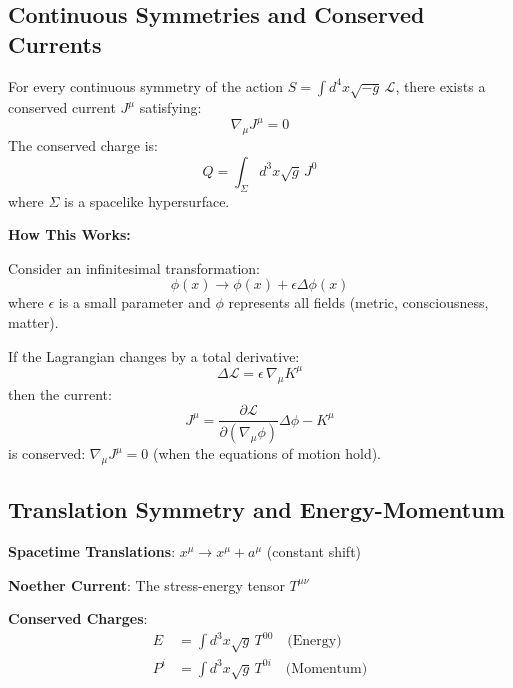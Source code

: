 \subsection{Continuous Symmetries and Conserved Currents}

\begin{theorem}\label{thm:noether}
For every continuous symmetry of the action $S = \int d^4x \sqrt{-g} \, \mathcal{L}$, there exists a conserved current $J^\mu$ satisfying\cite{noether1918,misner1973}:
\begin{equation}
\nabla_\mu J^\mu = 0
\end{equation}
The conserved charge is:
\begin{equation}
Q = \int_\Sigma d^3x \sqrt{g} \, J^0
\end{equation}
where $\Sigma$ is a spacelike hypersurface.
\end{theorem}

\begin{level2}
\textbf{How This Works:}

Consider an infinitesimal transformation:
\begin{equation}
\phi(x) \to \phi(x) + \epsilon \Delta\phi(x)
\end{equation}
where $\epsilon$ is a small parameter and $\phi$ represents all fields (metric, consciousness, matter).

If the Lagrangian changes by a total derivative:
\begin{equation}
\Delta \mathcal{L} = \epsilon \, \nabla_\mu K^\mu
\end{equation}
then the current:
\begin{equation}
J^\mu = \frac{\partial \mathcal{L}}{\partial(\nabla_\mu \phi)} \Delta\phi - K^\mu
\end{equation}
is conserved: $\nabla_\mu J^\mu = 0$ (when the equations of motion hold).
\end{level2}

\subsection{Translation Symmetry and Energy-Momentum}

\textbf{Spacetime Translations}: $x^\mu \to x^\mu + a^\mu$ (constant shift)

\textbf{Noether Current}: The stress-energy tensor $T^{\mu\nu}$

\textbf{Conserved Charges}:
\begin{align}
E &= \int d^3x \sqrt{g} \, T^{00} \quad \text{(Energy)} \\
P^i &= \int d^3x \sqrt{g} \, T^{0i} \quad \text{(Momentum)}
\end{align}

